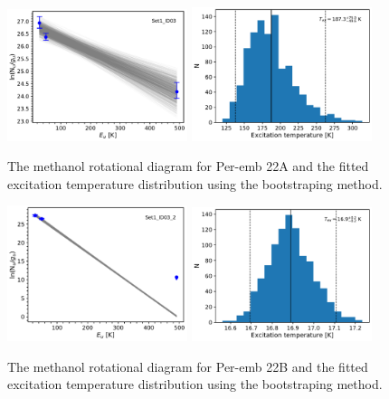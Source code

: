 \documentclass[twocolumn]{aastex62}
\begin{document}
\begin{figure}[htbp!]
  \centering
  \includegraphics[width=0.47\textwidth]{Set1_ID03.pdf}
  \includegraphics[width=0.47\textwidth]{Set1_ID03_rot_temps.pdf}
  \caption{The methanol rotational diagram for Per-emb 22A and the fitted excitation temperature distribution using the bootstraping method.}
  \label{}
\end{figure}

\begin{figure}[htbp!]
  \centering
  \includegraphics[width=0.47\textwidth]{Set1_ID03_2.pdf}
  \includegraphics[width=0.47\textwidth]{Set1_ID03_2_rot_temps.pdf}
  \caption{The methanol rotational diagram for Per-emb 22B and the fitted excitation temperature distribution using the bootstraping method.}
  \label{}
\end{figure}
\end{document}
